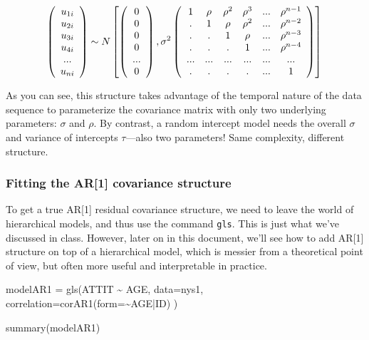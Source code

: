 \documentclass[
  letterpaper,
  DIV=11,
  numbers=noendperiod]{scrreprt}
\newenvironment{Shaded}{}{}
\newcommand{\AttributeTok}[1]{\textcolor[rgb]{0.49,0.56,0.16}{#1}}
\newcommand{\FunctionTok}[1]{\textcolor[rgb]{0.02,0.16,0.49}{#1}}
\newcommand{\NormalTok}[1]{#1}
\newcommand{\OtherTok}[1]{\textcolor[rgb]{0.00,0.44,0.13}{#1}}
\newcommand{\SpecialCharTok}[1]{\textcolor[rgb]{0.25,0.44,0.63}{#1}}
\begin{document}
\[\left(\begin{array}{c}
u_{1i}\\
u_{2i}\\
u_{3i}\\
u_{4i}\\
...\\
u_{ni}
\end{array}\right)\sim N\left[\left(\begin{array}{c}
0\\
0\\
0\\
0\\
...\\
0
\end{array}\right),\sigma^2\left(\begin{array}{cccccc}
1 & \rho  & \rho^2 & \rho^3 & ... & \rho^{n-1}\\
. & 1 & \rho & \rho^2 & ... & \rho^{n-2}\\
. & . & 1& \rho  & ... & \rho^{n-3}\\
. & . & . & 1 & ... & \rho^{n-4} \\
... & ... & ... & ... & ... & ... \\
. & . & . & . & ... & 1
\end{array}\right)\right]\\\]

As you can see, this structure takes advantage of the temporal nature of
the data sequence to parameterize the covariance matrix with only two
underlying parameters: \(\sigma\) and \(\rho\). By contrast, a random
intercept model needs the overall \(\sigma\) and variance of intercepts
\(\tau\)---also two parameters! Same complexity, different structure.

\subsubsection{Fitting the AR{[}1{]} covariance
structure}\label{fitting-the-ar1-covariance-structure}

To get a true AR{[}1{]} residual covariance structure, we need to leave
the world of hierarchical models, and thus use the command \texttt{gls}.
This is just what we've discussed in class. However, later on in this
document, we'll see how to add AR{[}1{]} structure on top of a
hierarchical model, which is messier from a theoretical point of view,
but often more useful and interpretable in practice.

\begin{Shaded}
\begin{Highlighting}[]
\NormalTok{modelAR1 }\OtherTok{=} \FunctionTok{gls}\NormalTok{(ATTIT }\SpecialCharTok{\textasciitilde{}}\NormalTok{ AGE, }
                    \AttributeTok{data=}\NormalTok{nys1,}
                    \AttributeTok{correlation=}\FunctionTok{corAR1}\NormalTok{(}\AttributeTok{form=}\SpecialCharTok{\textasciitilde{}}\NormalTok{AGE}\SpecialCharTok{|}\NormalTok{ID) )}

\FunctionTok{summary}\NormalTok{(modelAR1)}
\end{Highlighting}
\end{Shaded}
\end{document}
